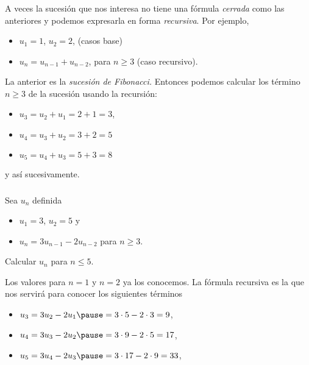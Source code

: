 \documentclass[handout]{beamer} %
\begin{document}
\begin{frame}\frametitle{ }  

A veces la sucesión que nos interesa no tiene una fórmula \textit{cerrada} como las anteriores y podemos expresarla en forma \textit{recursiva}.  \pause Por ejemplo,

\medspace

\begin{itemize}
	\item $u_1=1$, $u_2=2$, (casos base)   \pause
	\item $u_n =u_{n-1} +u_{n-2}$, para $n\ge 3$ (caso recursivo).   \pause
\end{itemize} 

\medspace

La anterior es la \textit{sucesión de Fibonacci.} Entonces podemos calcular los término $n \ge 3$  de la sucesión usando la recursión:

\medspace  \pause

\begin{itemize}
	\item $u_3 =  u_2 + u_1 =  2 +1=3$,  \pause
	\item $u_4 =  u_3 + u_2 = 3 +2 =5$  \pause
	\item $u_5 =  u_4 + u_3 = 5 +3 =8$
\end{itemize} 
y así sucesivamente.
\end{frame}


\begin{frame}\frametitle{} 
	 \begin{ejemplo} Sea $u_n$ definida
	 	\begin{itemize}
	 		\item $ u_1=3$, $u_2=5$ y
	 		\item $u_n=3 u_{n-1} - 2 u_{n-2}$ para $n\geq 3$.
	 	\end{itemize}
 	Calcular $u_n$ para $n \le 5$.\pause 
	 \end{ejemplo}
	\begin{solucion} \pause Los valores para $n=1$ y $n=2$ ya los conocemos. La fórmula recursiva es la que nos servirá para conocer los siguientes términos
	\begin{itemize}
	\pause \item $u_{3} = 3 u_{2} - 2 u_{1}\pause = 3 \cdot 5 - 2 \cdot 3 = 9$,
	\pause \item $u_{4} = 3 u_{3} - 2 u_{2}\pause = 3 \cdot 9 - 2 \cdot 5 = 17$,
	\pause \item $u_{5} = 3 u_{4} - 2 u_{3}\pause = 3 \cdot 17 - 2 \cdot 9  = 33$,

	\end{itemize}
	\end{solucion}
	
	 
	
\end{frame}
\end{document}
